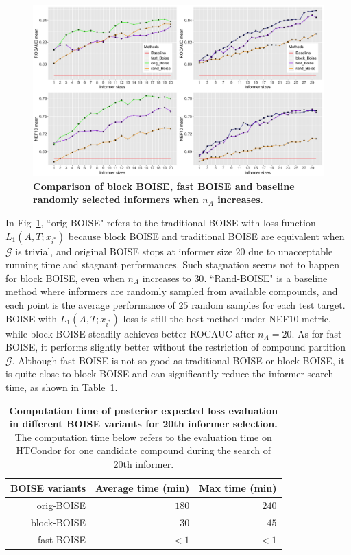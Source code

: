 \documentclass[11pt,a4paper]{article}
\theoremstyle{plain}
\begin{document}
\begin{figure}[!ht]
\centering
\includegraphics[width=5.0in]{Figs/roc_nef10_comparison.png}
\caption{\label{fig:roc_nef_compar_block_fast} 
{\bf Comparison of block BOISE, fast BOISE and baseline randomly selected informers when $n_A$ increases}.}
\end{figure}
In Fig~\ref{fig:roc_nef_compar_block_fast}, ``orig-BOISE" refers to the traditional BOISE with loss function $L_1(A, T;x_{i^*})$ because block BOISE and traditional BOISE are equivalent when $\mathcal G$ is trivial, and original BOISE stops at informer size $20$ due to unacceptable running time and stagnant performances. Such stagnation seems not to happen for block BOISE, even when $n_A$ increases to $30$. ``Rand-BOISE" is a baseline method where informers are randomly sampled from available compounds, and each point is the average performance of $25$ random samples for each test target.
BOISE with $L_1(A, T;x_{i^*})$ loss is still the best method under NEF10 metric, while block BOISE steadily achieves better ROCAUC after $n_A=20$. As for fast BOISE, it performs slightly better without the restriction of compound partition $\mathcal G$. Although fast BOISE is not so good as traditional BOISE or block BOISE, it is quite close to block BOISE and can significantly reduce the informer search time, as shown in Table~\ref{tab:running_time}. 

\begin{table}[htbp]
\caption{\label{tab:running_time}  {\bf Computation time of posterior expected loss evaluation in different BOISE variants for 20th informer selection.} The computation time below refers to the evaluation time on HTCondor for one candidate compound during the search of 20th informer. }
\begin{tabular}{r|rr}
\multicolumn{1}{c}{BOISE variants} & 
\multicolumn{1}{c}{Average time (min)} & 
\multicolumn{1}{c}{Max time (min)} 
\\
 \hline
 orig-BOISE &  $180$ & $240$\\
 block-BOISE & $30$ & $45$ \\
 fast-BOISE & $<1$ & $<1$\\
 \hline
\end{tabular}
\end{table}
\end{document}
